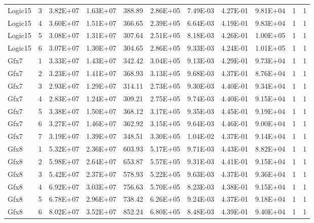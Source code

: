 \begin{longtable}{@{}l!{\vrule}r!{\vrule}c!{\vrule}c!{\vrule}c!{\vrule}c!{\vrule}c!{\vrule}c!{\vrule}c!{\vrule}c!{\vrule}c@{}}
Logic15 & 3 & 3.82E+07 & 1.63E+07 & 388.89 & 2.86E+05 & 7.49E-03 & 4.27E-01 & 9.81E+04 & 1 & 1 \\
Logic15 & 4 & 3.60E+07 & 1.51E+07 & 366.65 & 2.39E+05 & 6.64E-03 & 4.19E-01 & 9.83E+04 & 1 & 1 \\
Logic15 & 5 & 3.08E+07 & 1.31E+07 & 307.64 & 2.51E+05 & 8.18E-03 & 4.26E-01 & 1.00E+05 & 1 & 1 \\
Logic15 & 6 & 3.07E+07 & 1.30E+07 & 304.65 & 2.86E+05 & 9.33E-03 & 4.24E-01 & 1.01E+05 & 1 & 1 \\
\hline
Gfx7 & 1 & 3.33E+07 & 1.43E+07 & 342.42 & 3.04E+05 & 9.13E-03 & 4.29E-01 & 9.73E+04 & 1 & 1 \\
Gfx7 & 2 & 3.23E+07 & 1.41E+07 & 368.93 & 3.13E+05 & 9.68E-03 & 4.37E-01 & 8.76E+04 & 1 & 1 \\
Gfx7 & 3 & 2.93E+07 & 1.29E+07 & 314.11 & 2.73E+05 & 9.30E-03 & 4.40E-01 & 9.34E+04 & 1 & 1 \\
Gfx7 & 4 & 2.83E+07 & 1.24E+07 & 309.21 & 2.75E+05 & 9.74E-03 & 4.40E-01 & 9.15E+04 & 1 & 1 \\
Gfx7 & 5 & 3.38E+07 & 1.50E+07 & 368.12 & 3.17E+05 & 9.35E-03 & 4.45E-01 & 9.19E+04 & 1 & 1 \\
Gfx7 & 6 & 3.27E+07 & 1.46E+07 & 362.92 & 3.15E+05 & 9.64E-03 & 4.46E-01 & 9.00E+04 & 1 & 1 \\
Gfx7 & 7 & 3.19E+07 & 1.39E+07 & 348.51 & 3.30E+05 & 1.04E-02 & 4.37E-01 & 9.14E+04 & 1 & 1 \\
\hline
{}
Gfx8 & 1 & 5.32E+07 & 2.36E+07 & 603.93 & 5.17E+05 & 9.71E-03 & 4.43E-01 & 8.82E+04 & 1 & 1 \\
Gfx8 & 2 & 5.98E+07 & 2.64E+07 & 653.87 & 5.57E+05 & 9.31E-03 & 4.41E-01 & 9.15E+04 & 1 & 1 \\
Gfx8 & 3 & 5.42E+07 & 2.37E+07 & 578.93 & 5.22E+05 & 9.63E-03 & 4.37E-01 & 9.36E+04 & 1 & 1 \\
Gfx8 & 4 & 6.92E+07 & 3.03E+07 & 756.63 & 5.70E+05 & 8.23E-03 & 4.38E-01 & 9.15E+04 & 1 & 1 \\
Gfx8 & 5 & 6.78E+07 & 2.96E+07 & 738.42 & 6.26E+05 & 9.24E-03 & 4.37E-01 & 9.18E+04 & 1 & 1 \\
Gfx8 & 6 & 8.02E+07 & 3.52E+07 & 852.24 & 6.80E+05 & 8.48E-03 & 4.39E-01 & 9.40E+04 & 1 & 1 \\

\end{longtable}
